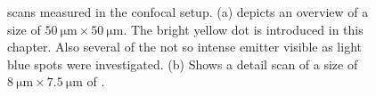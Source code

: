 	\begin{figure}[!htb]
		\begin{subfigure}{ 0.49\linewidth}
			\centering
			\caption{}
			\label{subfig::scan_1}
		\end{subfigure}
		\hfill
		\begin{subfigure}{ 0.49\linewidth}
			\centering
			\caption{}
			\label{subfig::scan_2}
		\end{subfigure}
		\caption[Confocal \pl scans]{\Pl scans measured in the confocal setup. (a) depicts an overview of a size of $\SI{50}{\micro\meter}\times\SI{50}{\micro\meter}$. The bright yellow dot is \embroad introduced in this chapter. Also several of the not so intense emitter visible as light blue spots were investigated. (b) Shows a detail scan of a size of $\SI{8}{\micro\meter}\times\SI{7.5}{\micro\meter}$ of \embroad.}
		\label{fig::scans}
	\end{figure}


